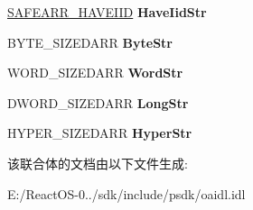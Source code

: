 \begin{DoxyCompactItemize}
\hyperlink{struct_i_ole_automation_types_1_1__wire_s_a_f_e_a_r_r___h_a_v_e_i_i_d}{S\+A\+F\+E\+A\+R\+R\+\_\+\+H\+A\+V\+E\+I\+ID} {\bfseries Have\+Iid\+Str}
\item 
\mbox{\label{union_i_ole_automation_types_1_1u_a8a2ba1848bb25e52c62c312fbd1445bf}} 
B\+Y\+T\+E\+\_\+\+S\+I\+Z\+E\+D\+A\+RR {\bfseries Byte\+Str}
\item 
\mbox{\label{union_i_ole_automation_types_1_1u_a1e9aaa07bdd2030fe89688bec950ba1f}} 
W\+O\+R\+D\+\_\+\+S\+I\+Z\+E\+D\+A\+RR {\bfseries Word\+Str}
\item 
\mbox{\label{union_i_ole_automation_types_1_1u_a734a9db93663a8a18bc60fc96b70e17a}} 
D\+W\+O\+R\+D\+\_\+\+S\+I\+Z\+E\+D\+A\+RR {\bfseries Long\+Str}
\item 
\mbox{\label{union_i_ole_automation_types_1_1u_a5e2d8a538ae11e44c4296fae91f20fc3}} 
H\+Y\+P\+E\+R\+\_\+\+S\+I\+Z\+E\+D\+A\+RR {\bfseries Hyper\+Str}
\end{DoxyCompactItemize}


该联合体的文档由以下文件生成\+:\begin{DoxyCompactItemize}
\item 
E\+:/\+React\+O\+S-\/0../sdk/include/psdk/oaidl.\+idl\end{DoxyCompactItemize}
